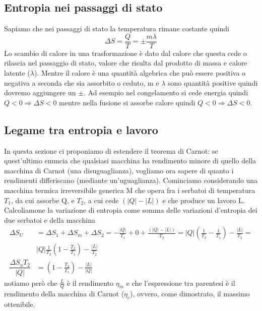 \documentclass[
10pt, %
a4paper, %
oneside, %
headinclude,footinclude, %
BCOR5mm, %
]{scrartcl}
\begin{document}
\subsection{Entropia nei passaggi di stato}
Sapiamo che nei passaggi di stato la temperatura rimane costante quindi
\[\Delta S = \frac{Q}{T}=\pm\frac{m\lambda}{T}\]
Lo scambio di calore in una trasformazione è dato dal calore che questa cede o rilascia nel passaggio di stato, valore che risulta dal prodotto di massa e calore latente ($\lambda$). Mentre il calore è una quantità algebrica che può essere positiva o negativa a seconda che sia assorbito o ceduto, m e $\lambda$ sono quantità positive quindi dovremo aggiungere un $\pm$. Ad esempio nel congelamento si cede energia quindi \(Q<0\Rightarrow \Delta S < 0\) mentre nella fusione si assorbe calore quindi \(Q<0\Rightarrow \Delta S < 0\). 
\subsection{Legame tra entropia e lavoro}
In questa sezione ci proponiamo di estendere il teorema di Carnot: se quest'ultimo enuncia che qualsiasi macchina ha rendimento minore di quello della macchina di Carnot (una disuguaglianza), vogliamo ora sapere di quanto i rendimenti differiscano (mediante un'uguaglianza). Cominciamo considerando una macchina termica irreversibile generica M che opera fra i serbatoi di temperatura \(T_1\), da cui assorbe Q, e \(T_2\), a cui cede \((|Q|-|L|)\) e che produce un lavoro L. Calcoliamone la variazione di entropia come somma delle variazioni d'entropia dei due serbatoi e della macchina
\begin{align*}
	\Delta S_U &= \Delta S_1 + \Delta S_m + \Delta S_2 = -\frac{|Q|}{T_1}+0+\frac{(|Q|-|L|)}{T_2}= |Q| \left(\frac{1}{T_2}-\frac{1}{T_1}\right)-\frac{|L|}{T_2}=\\
	&|Q|\frac{1}{T_2}\left(1-\frac{T_2}{T_1}\right)-\frac{|L|}{T_2}\\
	\dfrac{\Delta S_uT_2}{|Q|} &=  \left(1-\frac{T_2}{T_1}\right)-\frac{|L|}{|Q|}
\end{align*}
notiamo però che $\frac{L}{Q}$ è il rendimento \(\eta_m\) e che l'espressione tra parentesi è il rendimento della macchina di Carnot (\(\eta_c\)), ovvero, come dimostrato, il massimo ottenibile. 
\end{document}
